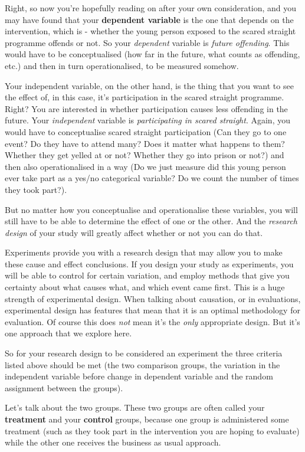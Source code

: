 \documentclass[
]{book}
\begin{document}
Right, so now you're hopefully reading on after your own consideration, and you may have found that your \textbf{dependent variable} is the one that depends on the intervention, which is - whether the young person exposed to the scared straight programme offends or not. So your \emph{dependent} variable is \emph{future offending}. This would have to be conceptualised (how far in the future, what counts as offending, etc.) and then in turn operationalised, to be measured somehow.

Your independent variable, on the other hand, is the thing that you want to see the effect of, in this case, it's participation in the scared straight programme. Right? You are interested in whether participation causes less offending in the future. Your \emph{independent} variable is \emph{participating in scared straight}. Again, you would have to conceptualise scared straight participation (Can they go to one event? Do they have to attend many? Does it matter what happens to them? Whether they get yelled at or not? Whether they go into prison or not?) and then also operationalised in a way (Do we just measure did this young person ever take part as a yes/no categorical variable? Do we count the number of times they took part?).

But no matter how you conceptualise and operationalise these variables, you will still have to be able to determine the effect of one or the other. And the \emph{research design} of your study will greatly affect whether or not you can do that.

Experiments provide you with a research design that may allow you to make these cause and effect conclusions. If you design your study as experiments, you will be able to control for certain variation, and employ methods that give you certainty about what causes what, and which event came first. This is a huge strength of experimental design. When talking about causation, or in evaluations, experimental design has features that mean that it is an optimal methodology for evaluation. Of course this does \emph{not} mean it's the \emph{only} appropriate design. But it's one approach that we explore here.

So for your research design to be considered an experiment the three criteria listed above should be met (the two comparison groups, the variation in the independent variable before change in dependent variable and the random assignment between the groups).

Let's talk about the two groups. These two groups are often called your \textbf{treatment} and your \textbf{control} groups, because one group is administered some treatment (such as they took part in the intervention you are hoping to evaluate) while the other one receives the business as usual approach.
\end{document}
